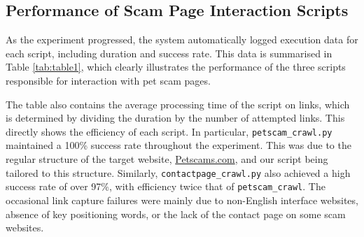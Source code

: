 \documentclass[ oneside,%
                    author={Cassie Qing Tang},
                    degree={BSc},
                     title={An Automated Response System for Disrupting Online Pet Scamming \\ },
                    subtitle={ }]{dissertation}
\begin{document}
\subsection{Performance of Scam Page Interaction Scripts}
As the experiment progressed, the system automatically logged execution data for each script, including duration and success rate. This data is summarised in Table \ref{tab:table1}, which clearly illustrates the performance of the three scripts responsible for interaction with pet scam pages.
{\small
\begin{table}[ht]
\centering
\label{tab:performance}
\caption{Summary of script performance metrics}
\label{tab:table1}
\end{table}
} 

The table also contains the average processing time of the script on links, which is determined by dividing the duration by the number of attempted links. This directly shows the efficiency of each script. In particular, \texttt{petscam\_crawl.py} maintained a 100\% success rate throughout the experiment. This was due to the regular structure of the target website, \href{www.petscams.com}{Petscams.com}, and our script being tailored to this structure. Similarly, \texttt{contactpage\_crawl.py} also achieved a high success rate of over 97\%, with efficiency twice that of \texttt{petscam\_crawl}. The occasional link capture failures were mainly due to non-English interface websites, absence of key positioning words, or the lack of the contact page on some scam websites.
\\
\end{document}
